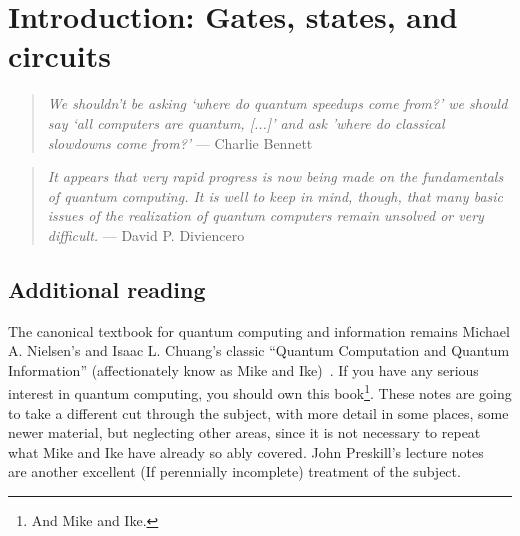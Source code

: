 

\clearpage


\clearpage
\section{Introduction: Gates, states, and circuits}


\begin{quote}
\emph{We shouldn't be asking `where do quantum speedups come from?' we should say `all computers are quantum, [...]' and ask 'where do classical slowdowns come from?'} --- Charlie Bennett~\cite{???}
\end{quote}


\begin{quote}
\emph{It appears that very rapid progress is now being made on the fundamentals of quantum computing. It is well to keep in mind, though, that many basic issues of the realization of quantum computers remain unsolved or very difficult.} --- David P. Diviencero ~\cite{DiVincenzo1995a}
\end{quote}

%
%
%
%
%
%
%

\subsection{Additional reading}
The canonical textbook for quantum computing and information remains Michael A. Nielsen's and Isaac L. Chuang's   
classic ``Quantum Computation and Quantum Information'' (affectionately know as Mike and Ike)~\cite{Nielsen2000a}.  
If you have any serious interest in quantum computing, you should own this book\footnote{And Mike and Ike.}.
These notes are 
going to take a different cut through the subject, with more detail in some places, some newer material, but neglecting other areas, since it is not necessary to repeat what Mike and Ike have already so ably covered. John Preskill's lecture notes~\cite{PreskillLectureNotes} are another excellent (If perennially incomplete) treatment of the subject.

